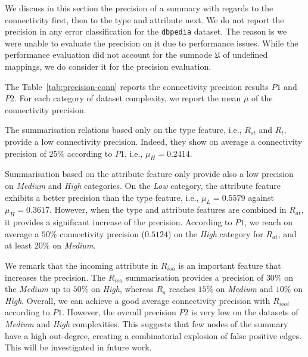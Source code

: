 We discuss in this section the precision of a summary with regards to the connectivity first, then to the type and attribute next. We do not report the precision in any error classification for the \texttt{dbpedia} dataset. The reason is we were unable to evaluate the precision on it due to performance issues. While the performance evaluation did not account for the sumnode $\mathfrak{U}$ of undefined mappings, we do consider it for the precision evaluation.


The Table~\ref{tab:precision-conn} reports the connectivity precision results $P1$ and $P2$. For each category of dataset complexity, we report the mean $\mu$ of the connectivity precision.

The summarisation relations based only on the type feature, i.e., $R_{st}$ and $R_t$, provide a low connectivity precision. Indeed, they show on average a connectivity precision of $25\%$ according to $P1$, i.e., $\mu_H=0.2414$.

Summarisation based on the attribute feature only provide also a low precision on \emph{Medium} and \emph{High} categories. On the \emph{Low} category, the attribute feature exhibits a better precision than the type feature, i.e., $\mu_L=0.5579$ against $\mu_H=0.3617$. However, when the type and attribute features are combined in $R_{at}$, it provides a significant increase of the precision. According to $P1$, we reach on average a $50\%$ connectivity precision ($0.5124$) on the \emph{High} category for $R_{at}$, and at least $20\%$ on \emph{Medium}.

We remark that the incoming attribute in $R_{ioa}$ is an important feature that increases the precision. The $R_{ioa}$ summarisation provides a precision of $30\%$ on the \emph{Medium} up to $50\%$ on \emph{High}, whereas $R_a$ reaches $15\%$ on \emph{Medium} and $10\%$ on \emph{High}. Overall, we can achieve a good average connectivity precision with $R_{ioat}$ according to $P1$. However, the overall precision $P2$ is very low on the datasets of \emph{Medium} and \emph{High} complexities. This suggests that few nodes of the summary have a high out-degree, creating a combinatorial explosion of false positive edges. This will be investigated in future work.

